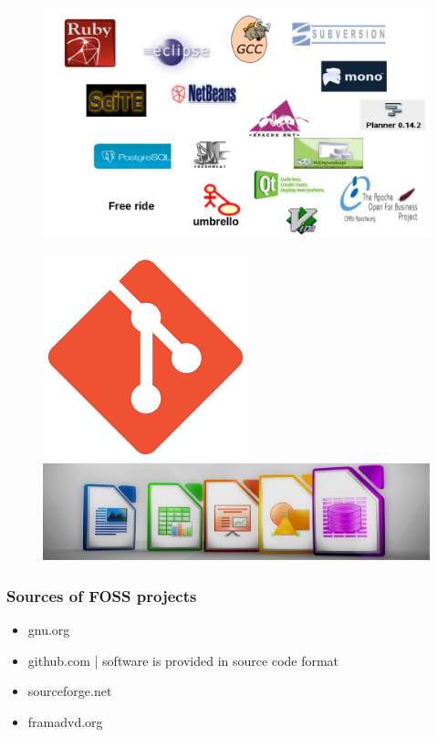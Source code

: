 \documentclass{beamer}
\begin{document}
	\begin{frame}
		\begin{flushleft}
			\begin{figure}
			\includegraphics[scale =0.9]{dev.png}
		\end{figure}
		\end{flushleft}
	\begin{figure}
		\includegraphics[scale =0.1]{git.png}
		\includegraphics[scale=.1]{openoffice}
	\end{figure}
	\end{frame}
	\begin{frame}
		\frametitle{Sources of FOSS projects}
		\begin{itemize}
			\item gnu.org
			\item github.com | software is provided in source code format
			\item sourceforge.net
			\item framadvd.org
		\end{itemize}
	\end{frame}
	
\end{document}
